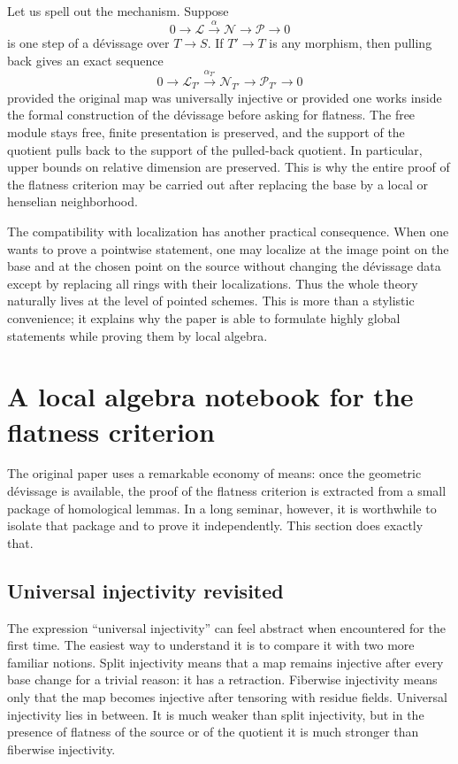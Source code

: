 \documentclass[11pt,oneside]{article}
\newcommand{\Lcal}{\mathcal L}
\newcommand{\N}{\mathcal N}
\newcommand{\Pcal}{\mathcal P}
\begin{document}
Let us spell out the mechanism.  Suppose
\[
0\to \Lcal\xrightarrow{\alpha}\N\to \Pcal\to 0
\]
is one step of a d\'evissage over $T\to S$.  If $T'\to T$ is any morphism, then pulling back gives an exact sequence
\[
0\to \Lcal_{T'}\xrightarrow{\alpha_{T'}}\N_{T'}\to \Pcal_{T'}\to 0
\]
provided the original map was universally injective or provided one works inside the formal construction of the d\'evissage before asking for flatness.  The free module stays free, finite presentation is preserved, and the support of the quotient pulls back to the support of the pulled-back quotient.  In particular, upper bounds on relative dimension are preserved.  This is why the entire proof of the flatness criterion may be carried out after replacing the base by a local or henselian neighborhood.

The compatibility with localization has another practical consequence.  When one wants to prove a pointwise statement, one may localize at the image point on the base and at the chosen point on the source without changing the d\'evissage data except by replacing all rings with their localizations.  Thus the whole theory naturally lives at the level of pointed schemes.  This is more than a stylistic convenience; it explains why the paper is able to formulate highly global statements while proving them by local algebra.

\section{A local algebra notebook for the flatness criterion}

The original paper uses a remarkable economy of means: once the geometric d\'evissage is available, the proof of the flatness criterion is extracted from a small package of homological lemmas.  In a long seminar, however, it is worthwhile to isolate that package and to prove it independently.  This section does exactly that.

\subsection{Universal injectivity revisited}

The expression \enquote{universal injectivity} can feel abstract when encountered for the first time.  The easiest way to understand it is to compare it with two more familiar notions.  Split injectivity means that a map remains injective after every base change for a trivial reason: it has a retraction.  Fiberwise injectivity means only that the map becomes injective after tensoring with residue fields.  Universal injectivity lies in between.  It is much weaker than split injectivity, but in the presence of flatness of the source or of the quotient it is much stronger than fiberwise injectivity.
\end{document}

